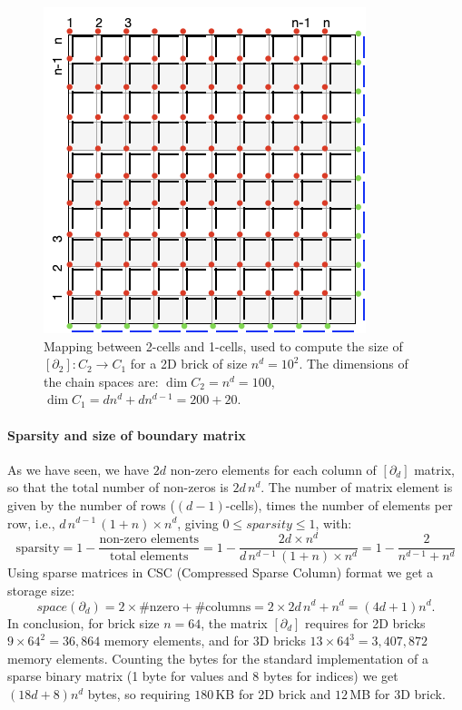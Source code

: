 \begin{figure}[htbp] %
    \centering
        \includegraphics[width=0.3\linewidth]{figs/grid2.png} 
   \caption{Mapping between 2-cells and 1-cells, used to compute the size of $[\partial_2]: C_2\to C_1$ for a 2D brick of size $n^d = 10^2$. The dimensions of the chain spaces are: $\dim C_2 = n^d = 100$, $\dim C_1 = dn^d + dn^{d-1} = 200+20$.  }
\end{figure}

\paragraph{Sparsity and size of boundary matrix }\label{sec:bm-size}

As we have seen, we have $2d$ non-zero elements for each column of $[\partial_d]$ matrix, so that the total number of non-zeros is $2d\,n^d$. The number of matrix element is given by the number of rows ($(d-1)$-cells), times the number of elements per row, i.e., $d\,n^{d-1}\,(1+n) \times n^d$, giving $0 \leq sparsity \leq 1$, with: 
\[
\mbox{sparsity} = 1 - 
\frac{\mbox{non-zero\ elements}}{\mbox{total\ elements}} =  1 - 
\frac{2d\times n^d}{d\,n^{d-1}\,(1+n) \times n^d} =  1 - 
\frac{2}{n^{d-1}+n^d}
\]
Using sparse matrices in CSC (Compressed Sparse Column) format we get a storage size:
\[
space(\partial_d) = 2\times \#\mbox{nzero} + \#\mbox{columns} = 2\times 2d\,n^d + n^d = (4d+1)n^d.
\]
In conclusion, for brick size $n=64$, the matrix $[\partial_d]$ requires for 2D bricks $9\times 64^2=36,864$ memory elements, and for 3D bricks $13\times 64^3=3,407,872$ memory elements. Counting the bytes for the standard implementation of a sparse binary matrix (1 byte for values and 8 bytes for indices) we get 
$(18d + 8) n^d$ bytes, so requiring $180$\,KB for 2D brick and $12$\,MB for 3D brick.





